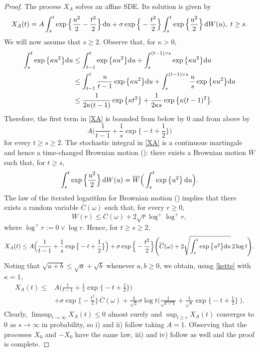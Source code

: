 \documentclass[sn-mathphys-num]{sn-jnl}
\theoremstyle{definition}
\newcommand{\scr}[1]{\mathscr #1}
\numberwithin{equation}{section} \theoremstyle{remark}
\renewcommand{\d}{\hbox{d}}
\def\d{\text{\rm{d}}} \def\bb{\beta} \def\aa{\alpha} \def\D{\scr D}
\newcommand{\1}{\mathbbm{1}}
\begin{document}
\begin{proof}
The process $X_A$ solves an affine SDE. Its solution is given by
\begin{equation}\label{XA}
X_A(t)=A\int_s^t \exp\Big\{ \frac {u^2}2-\frac {t^2}2\Big\}\,\d u +\sigma \exp\Big\{-\frac {t^2}2    \Big\} \int_s^t \exp\Big\{ \frac {u^2}2\Big\}\,\d W(u),\;t \geq s.
\end{equation}
We will now assume that $s \geq 2$. Observe that, for $\kappa >0$,
\begin{align}\label{kette}
\int_s^t  \exp\big\{\kappa u^2\big\}\d u &\leq \int_{t-1}^t  \exp\big\{\kappa u^2\big\}\d u + \int_s^{(t-1)\vee s}  \exp\big\{\kappa u^2\big\}\d u \nonumber\\
  &\leq  \int_{t-1}^t \frac u{t-1} \exp\big\{\kappa u^2\big\}\d u + \int_s^{(t-1)\vee s} \frac us \exp\big\{\kappa u^2\big\}\d u\\
  &\leq  \frac 1{2\kappa (t-1)}\exp\big\{ \kappa t^2\big\}+\frac 1{2\kappa s}\exp\big\{\kappa (t-1)^2\big\}.\nonumber
\end{align}
Therefore, the first term in \eqref{XA} is bounded from below by 0 and from above by
\begin{equation}\label{first}
A \Big(\frac 1{t-1}+\frac 1s\exp\big\{-t+\frac 12\big\}\Big)
\end{equation}
for every $t \geq s\geq 2$. The stochastic integral in \eqref{XA} is a continuous martingale and hence a time-changed Brownian motion (\cite[Theorem 3.4.6]{KS}): there exists a Brownian motion $\overline{W}$ such that, for $t \geq s$, 
$$
\int_s^t \exp\Big\{ \frac {u^2}2\Big\}\,\d W(u)=\overline{W}\Big(\int_s^t\exp\big\{u^2\big\}\,\d u\Big).
$$
The law of the iterated logarithm for Brownian motion (\cite[Theorem 2.9.23]{KS}) implies that there exists a random variable $\overline{C}(\omega)$ such that, for every $r \geq 0$,
$$
\overline{W}(r) \leq \overline{C}(\omega)+ 2\sqrt{r}\log^+\log^+r,
$$
where $\log^+r:=0\vee \log r$. Hence, for $t \geq s \geq 2$,
$$
X_A(t)\leq A \Big(\frac 1{t-1}+\frac 1s\exp\big\{-t+\frac 12\big\}\Big)            +\sigma \exp\Big\{-\frac {t^2}2    \Big\} \Bigg( \overline{C}(\omega)+ 2\sqrt{\int_s^t  \exp\big\{u^2\big\}\d u}\, 2 \log t\Bigg).
$$
Noting that $\sqrt{a+b}\leq \sqrt{a}+\sqrt{b}$ whenever $a,b\geq 0$, we obtain, using \eqref{kette} with $\kappa =1$, 
\begin{align*}
X_A(t)
  \leq  &A \Big(\frac 1{t-1}+\frac 1s\exp\Big\{-t+\frac 12\Big\}\Big)\\
    &+\sigma \exp\Big\{-\frac {t^2}2    \Big\}\,\overline{C}(\omega)+\frac 4 {\sqrt{2}}\sigma \log t \Big(  \frac 1{\sqrt{t-1}}+ \frac 1{\sqrt{s}}\exp\Big\{-t+\frac 12 \Big\}  \ \Big).
\end{align*}
Clearly, $\limsup_{t \to \infty}X_A(t)\leq 0$ almost surely and $\sup_{t \geq s}X_A(t)$ converges to 0 as $s \to \infty$ in probability, so i) and ii) follow taking $A=1$. Observing that
the processes $X_0$ and $-X_0$ have the same law, iii) and iv)  
follow as well and the proof is complete.
\end{proof}
\end{document}
